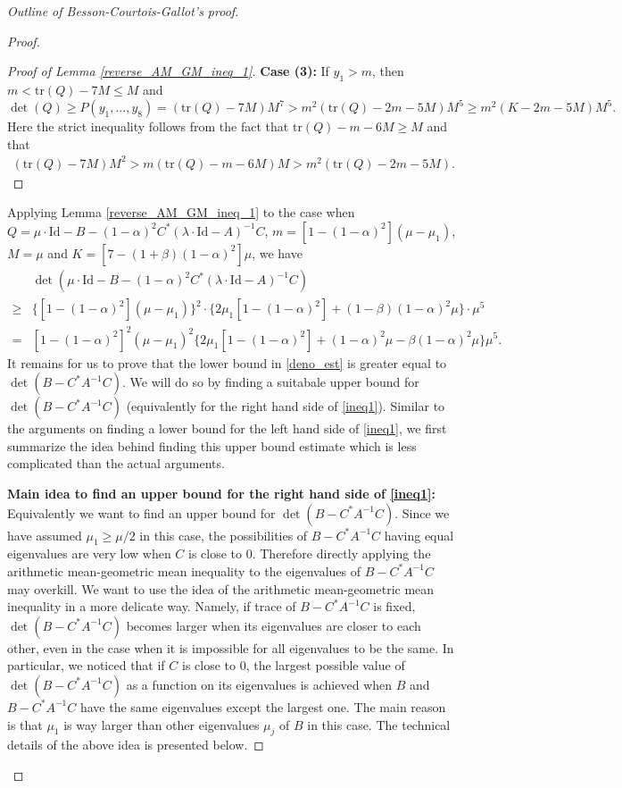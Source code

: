 \documentclass{article}
\newcommand{\id}{\mathrm{Id}}
\newcommand{\tr}{\mathrm{tr}}
\theoremstyle{definition}
\begin{document}
\begin{proof}[Outline of Besson-Courtois-Gallot's proof]
\begin{proof}
\begin{proof}[Proof of Lemma \ref{reverse_AM_GM_ineq_1}]
\textbf{Case (3):} If $y_1>m$, then $m< \tr(Q)-7M\leq M$ and 
$$\det(Q)\geq P(y_1,...,y_8)=(\tr(Q)-7M)M^7>m^2(\tr(Q)-2m-5M)M^5\geq m^2(K-2m-5M)M^5.$$
Here the strict inequality follows from the fact that $\tr(Q)-m-6M\geq M$ and that
\begin{align*}(\tr(Q)-7M)M^2> m(\tr(Q)-m-6M)M>m^2(\tr(Q)-2m-5M). \tag*{\qedhere}\end{align*}
\end{proof}
Applying Lemma \ref{reverse_AM_GM_ineq_1} to the case when $Q=\mu\cdot\id-B-(1-\alpha)^2C^*(\lambda\cdot\id-A)^{-1}C$, $m=[1-(1-\alpha)^2](\mu-\mu_1)$, $M=\mu$ and $K=[7-(1+\beta)(1-\alpha)^2]\mu$, we have
\begin{align}\label{deno_est}
&\det(\mu\cdot\id-B-(1-\alpha)^2C^*(\lambda\cdot\id-A)^{-1}C) \nonumber\\
\geq&\{[1-(1-\alpha)^2](\mu-\mu_1)\}^2\cdot \{2\mu_1[1-(1-\alpha)^2]+(1-\beta)(1-\alpha)^2\mu\}\cdot \mu^5 \nonumber\\
=&[1-(1-\alpha)^2]^2(\mu-\mu_1)^2\{2\mu_1[1-(1-\alpha)^2]+(1-\alpha)^2\mu-\beta(1-\alpha)^2\mu\}\mu^5. 
\end{align}
It remains for us to prove that the lower bound in \eqref{deno_est} is greater equal to $\det(B-C^*A^{-1}C)$. We will do so by finding a suitabale upper bound for $\det(B-C^*A^{-1}C)$ (equivalently for the right hand side of \eqref{ineq1}). Similar to the arguments on finding a lower bound for the left hand side of \eqref{ineq1}, we first summarize the idea behind finding this upper bound estimate which is less complicated than the actual arguments. 

\textbf{Main idea to find an upper bound for the right hand side of \eqref{ineq1}:} Equivalently we want to find an upper bound for $\det(B-C^*A^{-1}C)$. Since we have assumed $\mu_1\geq\mu/2$ in this case, the possibilities of $B-C^*A^{-1}C$ having equal eigenvalues are very low when $C$ is close to $0$. Therefore directly applying the arithmetic mean-geometric mean inequality to the eigenvalues of $B-C^*A^{-1}C$ may overkill. We want to use the idea of the arithmetic mean-geometric mean inequality in a more delicate way. Namely, if trace of $B-C^*A^{-1}C$ is fixed, $\det(B-C^*A^{-1}C)$ becomes larger when its eigenvalues are closer to each other, even in the case when it is impossible for all eigenvalues to be the same. In particular, we noticed that if $C$ is close to $0$, the largest possible value of $\det(B-C^*A^{-1}C)$ as a function on its eigenvalues is achieved when $B$ and $B-C^*A^{-1}C$ have the same eigenvalues except the largest one. The main reason is that $\mu_1$ is way larger than other eigenvalues $\mu_j$ of $B$ in this case. The technical details of the above idea is presented below.


\end{proof}
\end{proof}
\end{document}
